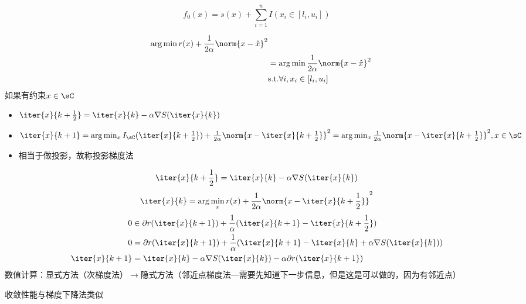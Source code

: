 \begin{example}
\[f_0(x)=s(x)+\sum_{i=1}^nI(x_i\in[l_i,u_i])\]
\end{example}
\begin{analysis}
\[\begin{aligned}
    \qquad\arg\min r(x)+\frac{1}{2\alpha}\norm{x-\hat{x}}^2\\
    &=\arg\min\frac{1}{2\alpha}\norm{x-\hat{x}}^2\\
    &\text{s.t.}\forall i, x_i\in[l_i,u_i]
\end{aligned}\]
如果有约束$x\in\sC$
\begin{itemize}
    \item $\iter{x}{k+\frac{1}{2}}=\iter{x}{k}-\alpha\nabla S(\iter{x}{k})$
    \item $\iter{x}{k+1}=\arg\min_x I_\sC(\iter{x}{k+\frac{1}{2}})+\frac{1}{2\alpha}\norm{x-\iter{x}{k+\frac{1}{2}}}^2=\arg\min_x\frac{1}{2\alpha}\norm{x-\iter{x}{k+\frac{1}{2}}}^2,x\in\sC$
    \item 相当于做投影，故称投影梯度法
\end{itemize}
\end{analysis}

\[\iter{x}{k+\frac{1}{2}}=\iter{x}{k}-\alpha\nabla S(\iter{x}{k})\]
\[\iter{x}{k}=\arg\min_x r(x)+\frac{1}{2\alpha}\norm{x-\iter{x}{k+\frac{1}{2}}}^2\]
\[\begin{aligned}
    0&\in\partial r(\iter{x}{k+1})+\frac{1}{\alpha}(\iter{x}{k+1}-\iter{x}{k+\frac{1}{2}})\\
    0&=\partial r(\iter{x}{k+1})+\frac{1}{\alpha}(\iter{x}{k+1}-\iter{x}{k}+\alpha\nabla S(\iter{x}{k}))\\
    \iter{x}{k+1}&=\iter{x}{k}-\alpha\nabla S(\iter{x}{k})-\alpha\partial r(\iter{x}{k+1})
\end{aligned}\]
数值计算：显式方法（次梯度法）$\to$隐式方法（邻近点梯度法---需要先知道下一步信息，但是这是可以做的，因为有邻近点）

收敛性能与梯度下降法类似

